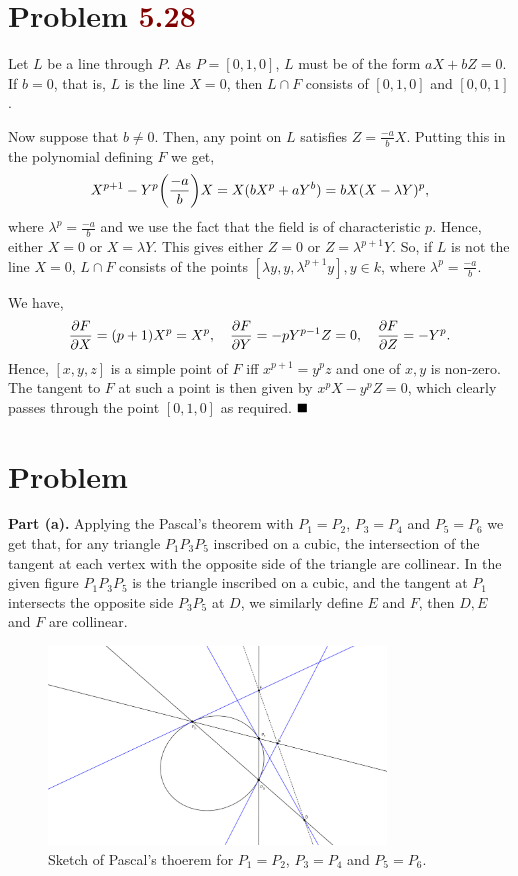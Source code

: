 \documentclass[12pt]{article}
\begin{document}
\section*{Problem \textcolor{maroon}{5.28}}

Let \( L \) be a line through \( P \). As \( P = [0,1,0] \), \( L \) must be of the form \( aX+bZ=0 \). If \( b = 0 \), that is, \( L \) is the line \( X = 0 \), then \( L \cap F \) consists of \( [0,1,0] \) and \( [0,0,1] \).
\smallskip

Now suppose that \( b \neq 0 \). Then, any point on \( L \) satisfies \( Z = \frac{-a}{b}X \). Putting this in the polynomial defining \( F \) we get,
\[
   X^{p+1}-Y^p \qty(\frac{-a}{b}) X = X(bX^p+aY^b) = bX (X-\lambda Y)^p,
\]
where \( \lambda^p = \frac{-a}{b} \) and we use the fact that the field is of characteristic \( p \). Hence, either \( X = 0 \) or \( X = \lambda Y \). This gives either \( Z = 0 \) or \( Z = \lambda^{p+1}Y \). So, if \( L \) is not the line \( X = 0 \), \( L \cap F \) consists of the points \( [\lambda y, y, \lambda^{p+1} y], y \in k \), where \( \lambda^p = \frac{-a}{b} \).
\smallskip

We have,
\[
   \pdv{F}{X} = (p+1)X^p = X^p, \quad \pdv{F}{Y} = -pY^{p-1}Z = 0, \quad \pdv{F}{Z} = -Y^p.
\]
Hence, \( [x,y,z] \) is a simple point of \( F \) iff \( x^{p+1} = y^pz \) and one of \( x,y \) is non-zero. The tangent to \( F \) at such a point is then given by \( x^p X -y^p Z = 0 \), which clearly passes through the point \( [0,1,0] \) as required. \(\hfill \blacksquare\)

\section*{Problem \color{maroon}{5.31}}
\textbf{Part (a).} Applying the Pascal's theorem with $P_1 = P_2$, $P_3 = P_4$ and $P_5 = P_6$ we get that, for any triangle $P_1P_3P_5$ inscribed on a cubic, the intersection of the tangent at each vertex with the opposite side of the triangle are collinear. In the given figure $P_1P_3P_5$ is the triangle inscribed on a cubic, and the tangent at $P_1$ intersects the opposite side $P_3P_5$ at $D$, we similarly define $E$ and $F$, then $D,E$ and $F$ are collinear.
\begin{figure}[H]
   \centering
   \includegraphics[width=0.8\textwidth]{pascal1.png}
   \caption{Sketch of Pascal's thoerem for $P_1 = P_2$, $P_3 = P_4$ and $P_5 = P_6$.}
\end{figure}
\end{document}
